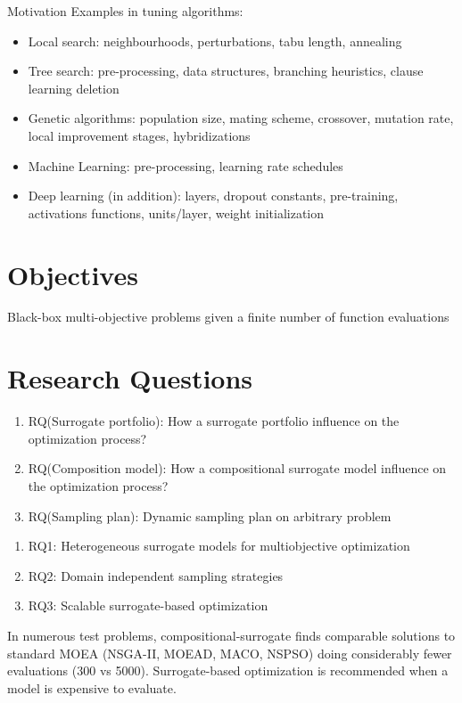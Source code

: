     Motivation Examples in tuning algorithms:
    \begin{itemize}
        \item Local search: neighbourhoods, perturbations, tabu length, annealing
        \item Tree search: pre-processing, data structures, branching heuristics, clause learning deletion
        \item Genetic algorithms: population size, mating scheme, crossover, mutation rate, local improvement stages, hybridizations
        \item Machine Learning: pre-processing, learning rate schedules
        \item Deep learning (in addition): layers, dropout constants, pre-training, activations functions, units/layer, weight initialization  
    \end{itemize}

\section{Objectives}
    Black-box multi-objective problems given a finite number of function evaluations

\section{Research Questions}
\begin{enumerate}
    \item RQ(Surrogate portfolio): How a surrogate portfolio influence on the optimization process?
    \item RQ(Composition model): How a compositional surrogate model influence on the optimization process?
    \item RQ(Sampling plan): Dynamic sampling plan on arbitrary problem
\end{enumerate}


\begin{enumerate}
    \item RQ1: Heterogeneous surrogate models for multiobjective optimization
    \item RQ2: Domain independent sampling strategies
    \item RQ3: Scalable surrogate-based optimization 
\end{enumerate}

In numerous test problems, compositional-surrogate finds comparable solutions to standard MOEA (NSGA-II, MOEAD, MACO, NSPSO) doing considerably fewer evaluations (300 vs 5000). 
Surrogate-based optimization is recommended when a model is expensive to evaluate.


